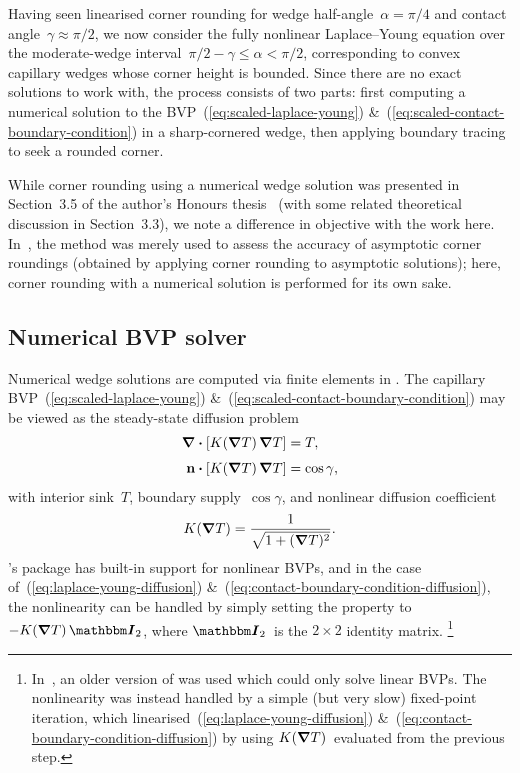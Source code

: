 Having seen linearised corner rounding
for wedge half-angle~$\alpha = \pi/4$
and contact angle~$\gamma \approx \pi/2$,
we now consider the fully nonlinear Laplace--Young equation
over the moderate-wedge interval~$\pi/2 - \gamma \le \alpha < \pi/2$,
corresponding to convex capillary wedges whose corner height is bounded.
Since there are no exact solutions to work with,
the process consists of two parts:
first computing a numerical solution
to the BVP~(\ref{eq:scaled-laplace-young})
\&~(\ref{eq:scaled-contact-boundary-condition})
in a sharp-cornered wedge,
then applying boundary tracing to seek a rounded corner.

While corner rounding using a numerical wedge solution
was presented in Section~3.5
of the author's Honours thesis~\cite{li-2017-thesis-rounding-capillary-wedge}
(with some related theoretical discussion in Section~3.3),
we note a difference in objective with the work here.
In~\cite{li-2017-thesis-rounding-capillary-wedge},
the method was merely used
to assess the accuracy of asymptotic corner roundings
(obtained by applying corner rounding to asymptotic solutions);
here, corner rounding with a numerical solution
is performed for its own sake.

\subsection{Numerical BVP solver}
\label{sec:moderate.nonlinear.numerical}

Numerical wedge solutions are computed
via finite elements in .
The capillary BVP~(\ref{eq:scaled-laplace-young})
\&~(\ref{eq:scaled-contact-boundary-condition})
may be viewed as the steady-state diffusion problem
\begin{align}
  \del \dotp \squarebr[\bulkysize]{K (\del T) \del T} &= T,
    \label{eq:laplace-young-diffusion}
    \\[\tallspace]
  \normalvec \dotp \squarebr[\bulkysize]{K (\del T) \del T} &= \cos\gamma,
  \label{eq:contact-boundary-condition-diffusion}
\end{align}
with interior sink~$T$, boundary supply~$\cos\gamma$,
and nonlinear diffusion coefficient
\begin{equation}
  K (\mathop{}\!\boldsymbol{\mathbf{\nabla}} T) = \frac{1}{\sqrt{1 + (\mathop{}\!\boldsymbol{\mathbf{\nabla}} T)^2}}.
  \label{eq:laplace-young-diffusion-coefficient}
\end{equation}
's  package
has built-in support for nonlinear BVPs,
and in the case of~(\ref{eq:laplace-young-diffusion})
\&~(\ref{eq:contact-boundary-condition-diffusion}),
the nonlinearity can be handled
by simply setting the  property
to~$-K (\del T) \idenmat[2]$,
where $\idenmat[2]$~is the $2 \times 2$ identity matrix.%
\footnote{
  In~\cite{li-2017-thesis-rounding-capillary-wedge},
  an older version of  was used
  which could only solve linear BVPs.
  The nonlinearity was instead handled
  by a simple (but very slow) fixed-point iteration,
  which linearised~(\ref{eq:laplace-young-diffusion})
  \&~(\ref{eq:contact-boundary-condition-diffusion})
  by using $K (\mathop{}\!\boldsymbol{\mathbf{\nabla}} T)$~evaluated from the previous step.
}

